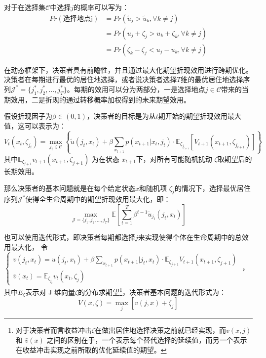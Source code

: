 \documentclass[a4paper,12pt,oneside]{book} %
\begin{document}
对于在选择集$\mathcal{C}$中选择$j$的概率可以写为：
\begin{equation}
\begin{split}
  Pr(\text{选择地点j})&=Pr(\tilde u_j > \tilde u_k, \forall k \neq j)
  \\&=Pr(u_j+\zeta_j>u_k+\zeta_k, \forall k \neq j)
  \\&=Pr(\zeta_k-\zeta_j<u_j-u_k, \forall k \neq j)
\end{split}
\label{eq:C中地点选择j的概率}
\end{equation}

在动态框架下，决策者具有前瞻性，并且通过最大化期望折现效用进行跨期优化。决策者在每期进行最优的居住地选择，或者说决策者选择$T$维的最优居住地选择序列$\mathcal{J}^*=\{j_1^*,j_2^*,\ldots,j_T^*\}$。每期的效用可以分为两部分，一是选择地点$j \in \mathcal{C}$带来的当期效用，二是折现的通过转移概率加权得到的未来期望效用。

假设折现因子为$\beta \in (0,1)$，决策者的目标是为从$t$期开始的期望折现效用最大值，这可以表示为：
\begin{equation}
  V_t(x_t, \zeta_{j_t}) = \max_{j_t \in \mathcal{C}} 
  \left\{ 
  \tilde{u}(j_t, x_t) + \beta \sum_{x_{t+1}} p(x_{t+1} | x_t, j_t) \cdot \mathbb{E}_{\zeta_{j_{t+1}}} [ V_{t+1}(x_{t+1}, \zeta_{j_{t+1}}) ]
  \right\}
\end{equation}
其中$\mathbb{E}_{\zeta_{j+1}} v_{t+1}(x_{t+1},\zeta_{j+1})$
为在状态 
$x_{t+1}$下，对所有可能随机扰动 
$\zeta$取期望后的长期效用。

那么决策者的基本问题就是在每个给定状态$x$和随机项 $\zeta_j$的情况下，选择最优居住序列$\mathcal{J}^*$使得全生命周期中的期望折现效用最大化，即：
\begin{equation}
  \max_{\mathcal{J}=\{j_1,j_2,\ldots,j_T\}} \mathbb{E} [ \sum_{t=1}^{T} \beta^{t-1} \tilde{u}_{j_t}(j_t,x_t) ]
\end{equation}

也可以使用迭代形式，即决策者每期都选择$j$来实现使得个体在生命周期中的总效用最大化，
令
$\begin{cases}
  v(j_{t},x_{t})=u(j_{t} ,x_{t})+\beta \sum_{x_{t+1}} p(x_{t+1}|j_t,x_t) \cdot \mathbb{E}_{\zeta_{j+1}} V_{t+1}(x_{t+1},\zeta_{j+1})
  \\
  \bar v(x_{t})=\mathbb{E}_{\zeta_{j_t}} v_{t}(x_{t},\zeta_{j})
\end{cases}$
，其中$E_{\zeta}$表示对 J 维向量$\zeta$的分布求期望\footnote{对于决策者而言收益冲击$\zeta$在做出居住地选择决策之前就已经实现，而$v(x,j)$ 和 $\bar v(x)$ 之间的区别在于，一个表示每个替代选择的延续值，而另一个表示在收益冲击实现之前所取的优化延续值的期望。}，决策者基本问题的迭代形式为：
\begin{equation}
V(x,\zeta)=\max\limits_{j}[v(j,x)+\zeta_{j}]
\end{equation}
\end{document}
